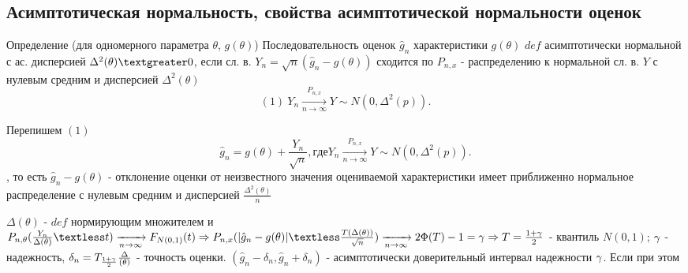 \subsection{Асимптотическая нормальность, свойства асимптотической нормальности оценок}

Определение (для одномерного параметра $\theta$, $g(\theta)$)
Последовательность оценок $\hat{g}_n$ характеристики $g(\theta)$ $def$ асимптотически нормальной с ас. дисперсией $\Delta^2(\theta) \textgreater 0$, если сл. в. $Y_n = \sqrt{n}(\hat{g}_n - g(\theta))$ сходится по $P_{n, x}$ - распределению к нормальной сл. в. $Y$ с нулевым средним и дисперсией $\Delta^2(\theta)$
\[
  (1)~ Y_n \xrightarrow[n \to \infty]{P_{n, x}} Y \sim N(0, \Delta^2(p))
.\]

Перепишем $(1)$
\[
  \hat{g}_n = g(\theta) + \frac{Y_n}{\sqrt{n}}, где Y_n \xrightarrow[n \to \infty]{P_{n, x}} Y \sim N(0, \Delta^2(p))
.\], то есть
$\hat{g}_n - g(\theta)$ - отклонение оценки от неизвестного значения оцениваемой характеристики имеет приближенно нормальное распределение с нулевым средним и дисперсией $\frac{\Delta^2(\theta)}{n}$


$\Delta(\theta)$ - $def$ нормирующим множителем и $P_{n, \theta}(\frac{Y_n}{\Delta(\theta)} \textless t) \xrightarrow[n \to \infty]{} F_{N(0, 1)}(t) \Rightarrow{} P_{n, x}(|\hat{g}_n - g(\theta)| \textless \frac{T(\Delta(\theta))} {\sqrt{n}}) \xrightarrow[n \to \infty]{} 2\Phi(T) - 1 = \g \Rightarrow{} T = \frac{1 + \g}{2}$ - квантиль $N(0, 1)$;
$\gamma$ - надежность, $\delta_n = T_{\frac{1 + \gamma}{2}}\frac{\Delta}{(\theta)}$ - точность оценки.
$(\hat{g}_n - \delta_n, \hat{g}_n + \delta_n)$ - асимптотически доверительный интервал надежности $\gamma$.
Если при этом
